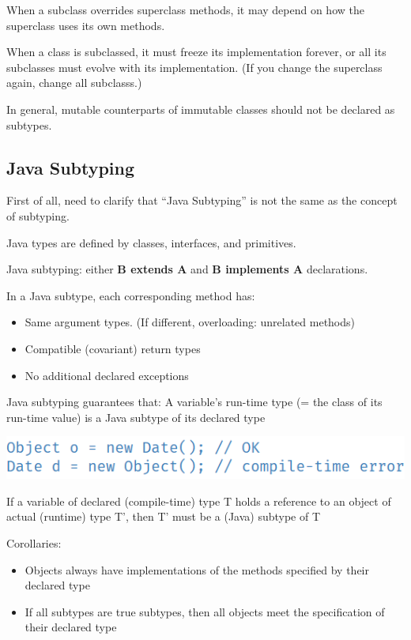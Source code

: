 \documentclass[letterpaper,12pt]{article}
\begin{document}
When a subclass overrides superclass methods, it may depend on how the
superclass uses its own methods.

When a class is subclassed, it must freeze its implementation forever,
or all its subclasses must evolve with its implementation. (If you change the
superclass again, change all subclasss.)

In general, mutable counterparts of immutable classes should not be declared as
subtypes.

\subsection{Java Subtyping}

First of all, need to clarify that ``Java Subtyping'' is not the same as the
concept of subtyping.

Java types are defined by classes, interfaces, and primitives.

Java subtyping: either \textbf{B extends A} and \textbf{B implements A}
declarations.

In a Java subtype, each corresponding method has:
\begin{itemize}
      \item Same argument types. (If different, overloading: unrelated methods)
      \item Compatible (covariant) return types
      \item No additional declared exceptions
\end{itemize}

Java subtyping guarantees that: A variable's run-time type (= the class of its
run-time value) is a Java subtype of its declared type

\includegraphics*{./summary_image/Java Subtpying Ganruntee.png}

If a variable of declared (compile-time) type T holds a reference to an object of actual (runtime) type T', then T' must be a (Java) subtype of T

Corollaries:
\begin{itemize}
      \item Objects always have implementations of the methods specified by their declared
            type
      \item If all subtypes are true subtypes, then all objects meet the specification of
            their declared type
\end{itemize}
\end{document}
